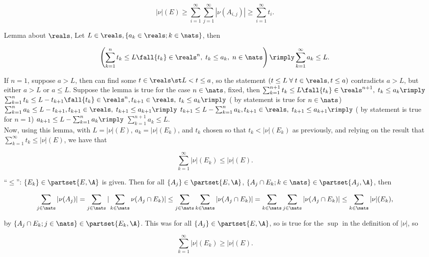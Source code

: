 $$    |\nu|(E) \ge \sum_{i =1 }^\infty \sum_{j =1}^\infty |\nu(A_{i,j})| \ge \sum_{i=1}^\infty t_i. $$

\noindent
Lemma about $\reals$, Let $L \in \reals, \{ a_k \in \reals; k \in \nats \}$, then

$$
\left(  \sum_{k=1}^n t_k \le L  \fall \{ t_k \} \in \reals^n, \; t_k \le a_k, \; n \in \nats  \right) \rimply \sum_{k = 1} ^ \infty a_k \le L.
$$

\noindent
If $n=1$, suppose $a > L$, then can find some $t \in \reals \st L < t \le a$, so the statement $ \left( t \le L  \; \forall \; t \in \reals, t \le a \right)$ contradicts $a > L$, but either $a > L$ or  $a \le L$. Suppose the lemma is true for the case $n \in \nats$, fixed, then $  \sum_{k=1}^{n+1} t_k \le L  \fall \{ t_k \} \in \reals^{n+1}, \; t_k \le a_k  \rimply$
$  \sum_{k=1}^{n} t_k \le L-t_{k+1}  \fall \{ t_k \} \in \reals^{n}, t_{k+1} \in \reals, \; t_k \le a_k \rimply$ ( by statement is true for $n \in \nats$)
$  \sum_{k=1}^{n} a_k \le L-t_{k+1},  t_{k+1} \in \reals, \; t_{k+1} \le a_{k+1} \rimply$
$  t_{k+1} \le L-\sum_{k=1}^{n} a_k,  t_{k+1} \in \reals, \; t_{k+1} \le a_{k+1} \rimply$
( by statement is true for $n=1$) $a_{k+1} \le L-\sum_{k=1}^{n} a_k \rimply $  $\sum_{k=1}^{n+1} a_k \le L$. \\


\noindent
Now, using this lemma, with $L = |\nu|(E)$, $a_k = |\nu|(E_k)$, and ${t_k}$ chosen so that ${t_k} < |\nu|(E_k)$ as previously, and relying on the result that $ \sum_{k=1}^\infty t_k \le  |\nu|(E) $, we have that

$$
\sum_{k=1}^\infty |\nu|(E_k) \le |\nu|(E).
$$



\noindent
``$\le$'':  $\{ E_k \} \in \partset{ E, \A }$ is given. Then for all $\{ A_j \} \in \partset{ E, \A }$, $\{ A_j \cap E_k; k \in \nats \} \in \partset{ A_j, \A }$, then

$$
    \sum_{j \in \nats} | \nu(A_j) | = \sum_{j \in \nats} | \sum_{k \in \nats} \nu( A_j \cap E_k)| 
    \le \sum_{j \in \nats} \sum_{k \in \nats} | \nu(A_j \cap E_k) | 
    =   \sum_{k \in \nats} \sum_{j \in \nats} | \nu(A_j \cap E_k) | \le \sum_{k \in \nats} |\nu|(E_k),
$$


\noindent
by $\{ A_j \cap E_k; j \in \nats \} \in \partset{ E_k, \A }$. This was for all $\{ A_j \} \in \partset{ E, \A }$, so is true for the $\sup$ in the definition of $|\nu|$, so

$$
\sum_{k=1}^\infty |\nu|(E_k) \ge |\nu|(E).
$$

